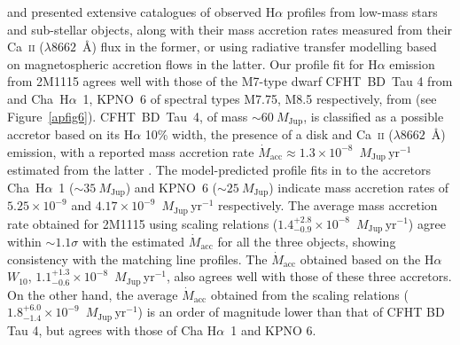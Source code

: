 \documentclass{aa}
\newcommand{\mj}{\ensuremath{M_\mathrm{Jup}}\xspace}
\newcommand{\mjyr}{\ensuremath{M_\mathrm{Jup}\,\mathrm{yr^{-1}}}\xspace}
\newcommand{\Ha}{\ensuremath{\mathrm{H}\alpha}\xspace}
\newcommand{\mdot}{\ensuremath{\dot{M}_{\mathrm{acc}}}\xspace}
\newcommand{\Wten}{\ensuremath{W_{10}}\xspace}
\begin{document}
\cite{mohanty2005} and \cite{muzerolle2005} presented extensive catalogues of observed \Ha profiles from low-mass stars and sub-stellar objects, along with their mass accretion rates measured from their Ca~\textsc{ii} ($\lambda8662$~\AA) flux in the former, or using radiative transfer modelling based on magnetospheric accretion flows \citep{muzerolle2001} in the latter. Our profile fit for \Ha emission from 2M1115 agrees well with those of the M7-type dwarf CFHT~BD~Tau 4 from \cite{mohanty2005} and Cha~\Ha~1, KPNO~6 of spectral types M7.75, M8.5 respectively, from \cite{muzerolle2005} %
(see Figure~\ref{apfig6}). CFHT~BD~Tau~4, of mass $\sim60~\mj$, is classified as a possible accretor based on its \Ha 10\% width, the presence of a disk and Ca~\textsc{ii} ($\lambda8662$~\AA) emission, with a reported mass accretion rate \mdot$\approx1.3\times10^{-8}$~\mjyr estimated from the latter \citep{mohanty2005}. The model-predicted profile fits in \cite{muzerolle2005} to the accretors Cha~\Ha~1 ($\sim35~\mj$) and KPNO~6 ($\sim25~\mj$) indicate mass accretion rates of $5.25\times10^{-9}$ and $4.17\times10^{-9}$~\mjyr respectively. The average mass accretion rate obtained for 2M1115 using \cite{aoyama2021} scaling relations ($1.4^{+2.8}_{-0.9}\times10^{-8}$~\mjyr) agree within $\sim1.1\sigma$ with the estimated \mdot for all the three objects, showing consistency with the matching line profiles. The \mdot obtained based on the \Ha~\Wten \citep{natta2004}, $1.1^{+1.3}_{-0.6}\times10^{-8}$~\mjyr, also agrees well with those of these three accretors. On the other hand, the average \mdot obtained from the \citep{alcala2017} scaling relations ($1.8^{+6.0}_{-1.4}\times10^{-9}$~\mjyr) is an order of magnitude lower than that of CFHT BD Tau 4, but agrees with those of Cha \Ha~1 and KPNO 6.
\end{document}
